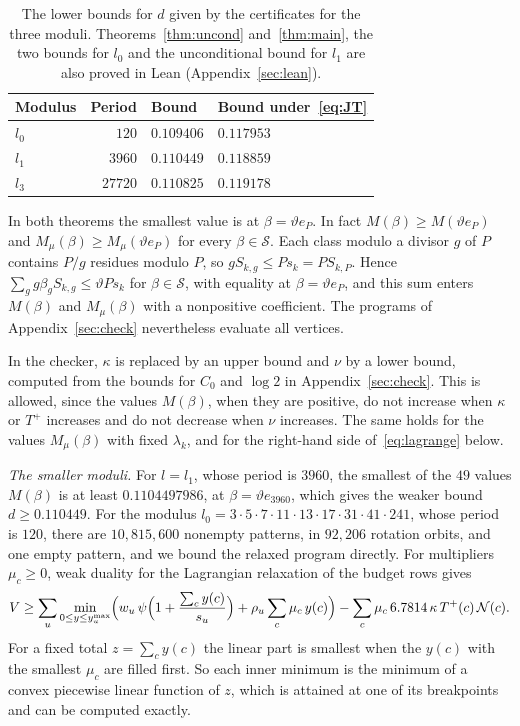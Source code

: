 \documentclass[11pt]{amsart}
\theoremstyle{definition}
\theoremstyle{remark}
\numberwithin{equation}{section}
\newcommand{\DmainE}{0.118859}%
\newcommand{\DmainG}{0.119178}%
\newcommand{\DcertG}{0.1191789096}
\newcommand{\Dcw}{0.117953}
\newcommand{\DuncondE}{0.110449}%
\newcommand{\DuncondEcert}{0.1104497986}
\newcommand{\DuncondG}{0.110825}%
\newcommand{\DuncondGcert}{0.1108257388}
\newcommand{\Dweak}{0.109406}
\newcommand{\Lich}{6.7814}
\newcommand{\PerOne}{3960}
\newcommand{\PerG}{27720}
\newcommand{\Duncond}{\DuncondG}\newcommand{\Duncondcert}{\DuncondGcert}
\newcommand{\Dmain}{\DmainG}\newcommand{\Dcert}{\DcertG}
\newcommand{\PerO}{120}
\newcommand{\Orbits}{92{,}206}
\newcommand{\Patterns}{10{,}815{,}600}
\newcommand{\ModulusO}{3\cdot5\cdot7\cdot11\cdot13\cdot17\cdot31\cdot41\cdot241}
\begin{document}
\begin{table}[ht]
\centering
\small
\caption{The lower bounds for $d$ given by the certificates for the three moduli. Theorems~\ref{thm:uncond} and~\ref{thm:main}, the two bounds for $l_0$ and the unconditional bound for $l_1$ are also proved in Lean (Appendix~\ref{sec:lean}).}\label{tab:bounds}
\begin{tabular}{@{}lrll@{}}
\toprule
Modulus & Period & Bound & Bound under~\eqref{eq:JT}\\
\midrule
$l_0$ & $\PerO$ & $\Dweak$ & $\Dcw$\\
$l_1$ & $\PerOne$ & $\DuncondE$ & $\DmainE$\\
$l_3$ & $\PerG$ & $\Duncond$ & $\Dmain$\\
\bottomrule
\end{tabular}
\end{table}

In both theorems the smallest value is at $\beta=\vartheta e_P$. In fact $M(\beta)\ge M(\vartheta e_P)$ and $M_\mu(\beta)\ge M_\mu(\vartheta e_P)$ for every $\beta\in\mathcal S$. Each class modulo a divisor $g$ of $P$ contains $P/g$ residues modulo $P$, so $gS_{k,g}\le Ps_k=PS_{k,P}$. Hence $\sum_gg\beta_gS_{k,g}\le\vartheta Ps_k$ for $\beta\in\mathcal S$, with equality at $\beta=\vartheta e_P$, and this sum enters $M(\beta)$ and $M_\mu(\beta)$ with a nonpositive coefficient. The programs of Appendix~\ref{sec:check} nevertheless evaluate all vertices.

In the checker, $\kappa$ is replaced by an upper bound and $\nu$ by a lower bound, computed from the bounds for $C_0$ and $\log2$ in Appendix~\ref{sec:check}. This is allowed, since the values $M(\beta)$, when they are positive, do not increase when $\kappa$ or $T^+$ increases and do not decrease when $\nu$ increases. The same holds for the values $M_\mu(\beta)$ with fixed $\lambda_k$, and for the right-hand side of~\eqref{eq:lagrange} below.

\emph{The smaller moduli.} For $l=l_1$, whose period is $\PerOne$, the smallest of the $49$ values $M(\beta)$ is at least $\DuncondEcert$, at $\beta=\vartheta e_{3960}$, which gives the weaker bound $d\ge\DuncondE$. For the modulus $l_0=\ModulusO$, whose period is $\PerO$, there are $\Patterns$ nonempty patterns, in $\Orbits$ rotation orbits, and one empty pattern, and we bound the relaxed program directly. For multipliers $\mu_c\ge0$, weak duality for the Lagrangian relaxation of the budget rows gives
\begin{equation}\label{eq:lagrange}
V\ge\sum_u\min_{0\le y\le y^{\max}_u}\Bigl(w_u\,\psi\Bigl(1+\frac{\sum_cy(c)}{s_u}\Bigr)+\rho_u\sum_c\mu_c\,y(c)\Bigr)-\sum_c\mu_c\,\Lich\,\kappa\,T^+(c)\,\mathcal N(c).
\end{equation}
For a fixed total $z=\sum_cy(c)$ the linear part is smallest when the $y(c)$ with the smallest $\mu_c$ are filled first. So each inner minimum is the minimum of a convex piecewise linear function of $z$, which is attained at one of its breakpoints and can be computed exactly.
\end{document}
